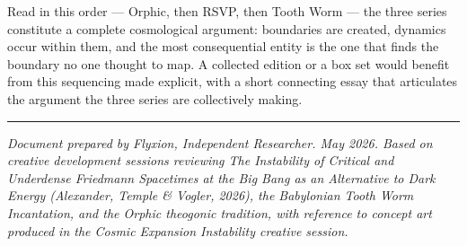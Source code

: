 \documentclass[12pt, a4paper]{article}
\begin{document}
Read in this order --- Orphic, then RSVP, then Tooth Worm --- the three series constitute a complete cosmological argument: boundaries are created, dynamics occur within them, and the most consequential entity is the one that finds the boundary no one thought to map. A collected edition or a box set would benefit from this sequencing made explicit, with a short connecting essay that articulates the argument the three series are collectively making.

\vspace{2em}
\noindent\rule{\linewidth}{0.4pt}

\vspace{1em}
\noindent\textit{Document prepared by Flyxion, Independent Researcher. May 2026. Based on creative development sessions reviewing \textit{The Instability of Critical and Underdense Friedmann Spacetimes at the Big Bang as an Alternative to Dark Energy} (Alexander, Temple \& Vogler, 2026), the Babylonian Tooth Worm Incantation, and the Orphic theogonic tradition, with reference to concept art produced in the Cosmic Expansion Instability creative session.}
\end{document}
